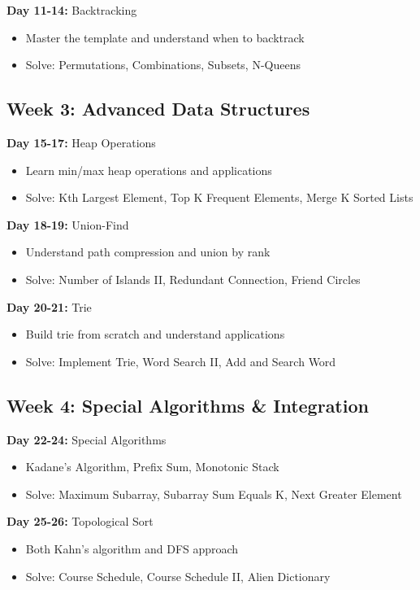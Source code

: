\documentclass[10pt,a4paper]{article}
\begin{document}
\textbf{Day 11-14:} Backtracking
\begin{itemize}
\item Master the template and understand when to backtrack
\item Solve: Permutations, Combinations, Subsets, N-Queens
\end{itemize}

\subsection{Week 3: Advanced Data Structures}
\textbf{Day 15-17:} Heap Operations
\begin{itemize}
\item Learn min/max heap operations and applications
\item Solve: Kth Largest Element, Top K Frequent Elements, Merge K Sorted Lists
\end{itemize}

\textbf{Day 18-19:} Union-Find
\begin{itemize}
\item Understand path compression and union by rank
\item Solve: Number of Islands II, Redundant Connection, Friend Circles
\end{itemize}

\textbf{Day 20-21:} Trie
\begin{itemize}
\item Build trie from scratch and understand applications
\item Solve: Implement Trie, Word Search II, Add and Search Word
\end{itemize}

\subsection{Week 4: Special Algorithms \& Integration}
\textbf{Day 22-24:} Special Algorithms
\begin{itemize}
\item Kadane's Algorithm, Prefix Sum, Monotonic Stack
\item Solve: Maximum Subarray, Subarray Sum Equals K, Next Greater Element
\end{itemize}

\textbf{Day 25-26:} Topological Sort
\begin{itemize}
\item Both Kahn's algorithm and DFS approach
\item Solve: Course Schedule, Course Schedule II, Alien Dictionary
\end{itemize}
\end{document}
